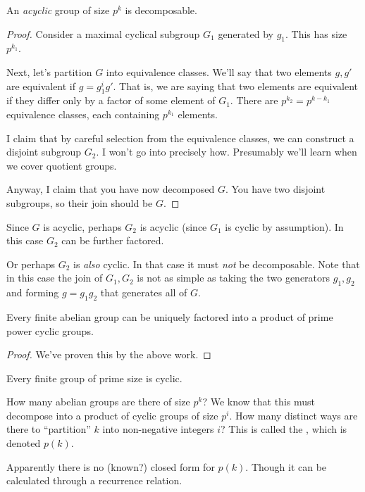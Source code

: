 \begin{theorem}
  An \emph{acyclic} group of size $p^k$ is decomposable.
\end{theorem}

\begin{proof}
  Consider a maximal cyclical subgroup $G_1$ generated by $g_1$. This
  has size $p^{k_1}$.

  Next, let's partition $G$ into equivalence classes. We'll say that two
  elements $g, g'$ are equivalent if $g = g_1^i g'$. That is, we are
  saying that two elements are equivalent if they differ only by a
  factor of some element of $G_1$. There are $p^{k_2} = p^{k - k_1}$
  equivalence classes, each containing $p^{k_1}$ elements.

  I claim that by careful selection from the equivalence classes, we can
  construct a disjoint subgroup $G_2$. I won't go into precisely how.
  Presumably we'll learn when we cover quotient groups.

  Anyway, I claim that you have now decomposed $G$. You have two
  disjoint subgroups, so their join should be $G$.
\end{proof}

\begin{remark}
  Since $G$ is acyclic, perhaps $G_2$ is acyclic (since $G_1$ is cyclic
  by assumption). In this case $G_2$ can be further factored.

  Or perhaps $G_2$ is \emph{also} cyclic. In that case it must
  \emph{not} be decomposable. Note that in this case the join of $G_1,
  G_2$ is not as simple as taking the two generators $g_1, g_2$ and
  forming $g = g_1 g_2$ that generates all of $G$.
\end{remark}

\begin{theorem}

  Every finite abelian group can be uniquely factored into a product of
  prime power cyclic groups.
\end{theorem}

\begin{proof}
  We've proven this by the above work.
\end{proof}

\begin{corollary}
  Every finite group of prime size is cyclic.
\end{corollary}

\begin{remark}
  How many abelian groups are there of size $p^k$? We know that this
  must decompose into a product of cyclic groups of size $p^i$. How many
  distinct ways are there to ``partition'' $k$ into non-negative
  integers $i$? This is called the , which is
  denoted $p(k)$.

  Apparently there is no (known?) closed form for $p(k)$. Though it can
  be calculated through a recurrence relation.
\end{remark}

